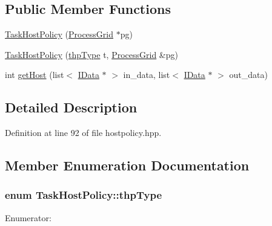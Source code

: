\subsection*{Public Member Functions}
\begin{DoxyCompactItemize}
\item 
\hyperlink{class_task_host_policy_af9c550ad2f9c9a9bdcd8af4165954e58}{TaskHostPolicy} (\hyperlink{class_process_grid}{ProcessGrid} $\ast$pg)
\item 
\hyperlink{class_task_host_policy_a4204418e800499b0f5a2e4daf4672b91}{TaskHostPolicy} (\hyperlink{class_task_host_policy_a6b46066c98977d804c0d8e4b5f999a65}{thpType} t, \hyperlink{class_process_grid}{ProcessGrid} \&pg)
\item 
int \hyperlink{class_task_host_policy_a1da54714fedb9ee51d454f39bfe32a4f}{getHost} (list$<$ \hyperlink{class_i_data}{IData} $\ast$ $>$ in\_\-data, list$<$ \hyperlink{class_i_data}{IData} $\ast$ $>$ out\_\-data)
\end{DoxyCompactItemize}


\subsection{Detailed Description}


Definition at line 92 of file hostpolicy.hpp.

\subsection{Member Enumeration Documentation}
\hypertarget{class_task_host_policy_a6b46066c98977d804c0d8e4b5f999a65}{
\subsubsection[{thpType}]{\setlength{\rightskip}{0pt plus 5cm}enum {\bf TaskHostPolicy::thpType}}}
\label{class_task_host_policy_a6b46066c98977d804c0d8e4b5f999a65}
\begin{Desc}
\item[Enumerator: ]\par
\begin{description}
\item[{\em 
\hypertarget{class_task_host_policy_a6b46066c98977d804c0d8e4b5f999a65a0d391edf9d8abeca77d046c726d0ca8e}{
WRITE\_\-DATA\_\-OWNER}
\label{class_task_host_policy_a6b46066c98977d804c0d8e4b5f999a65a0d391edf9d8abeca77d046c726d0ca8e}
}]\end{description}
\end{Desc}



